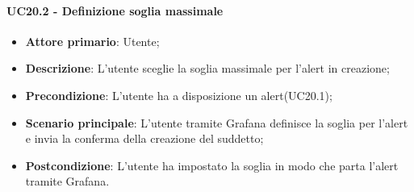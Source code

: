 \paragraph{UC20.2 - Definizione soglia massimale}
\label{para:uc20.2}
\begin{itemize}
  \item \textbf{Attore primario}: Utente;
  \item \textbf{Descrizione}: L'utente sceglie la soglia massimale per l'alert in creazione;
  \item \textbf{Precondizione}: L'utente ha a disposizione un alert(UC20.1);
  \item \textbf{Scenario principale}: L'utente tramite Grafana definisce la soglia per l'alert e invia la conferma della creazione del suddetto;
  \item \textbf{Postcondizione}: L'utente ha impostato la soglia in modo che parta l'alert tramite Grafana.
\end{itemize}

